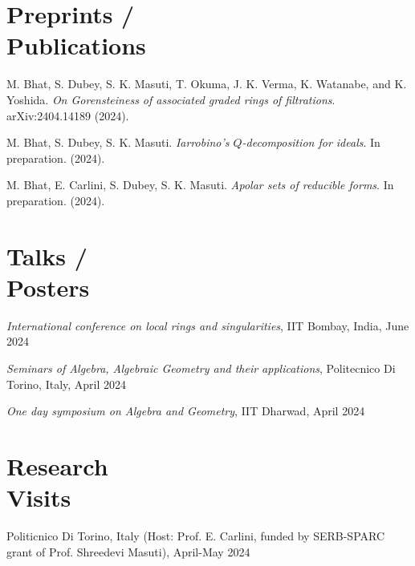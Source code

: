 \documentclass[margin,line,pifont,palatino,courier]{res}
\begin{document}
\begin{resume}

\section{\sc Preprints / \\ Publications}
 
 M. Bhat, S. Dubey, S. K. Masuti, T. Okuma, J. K. Verma, K. Watanabe, and K. Yoshida. {\it On Gorensteiness of associated graded rings of filtrations}. arXiv:2404.14189 (2024).

 M. Bhat, S. Dubey, S. K. Masuti. {\it Iarrobino's $Q$-decomposition for ideals}. In preparation. (2024).

 M. Bhat, E. Carlini, S. Dubey, S. K. Masuti. {\it Apolar sets of reducible forms}. In preparation. (2024).


\section{\sc Talks / \\ Posters}
\textit{International conference on local rings and singularities}, IIT Bombay, India, June 2024

\textit{Seminars of Algebra, Algebraic Geometry and their applications}, Politecnico Di Torino, Italy, April 2024

\textit{One day symposium on Algebra and Geometry}, IIT Dharwad, April 2024






\section{\sc Research \\ Visits}
Politicnico Di Torino, Italy (Host: Prof. E. Carlini, funded by SERB-SPARC grant of Prof. Shreedevi Masuti), April-May 2024


\end{resume}
\end{document}
